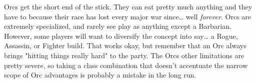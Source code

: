 
Orcs get the short end of the stick. They can eat pretty much anything and they have to because their race has lost every major war since\ldots{} well \textit{forever}. Orcs are extremely specialized, and rarely see play as anything except a Barbarian. However, some players will want to diversify the concept into say\ldots{} a Rogue, Assassin, or Fighter build. That works okay, but remember that an Orc always brings "hitting things really hard" to the party. The Orcs other limitations are pretty severe, so taking a class combination that doesn't accentuate the narrow scope of Orc advantages is probably a mistake in the long run.

